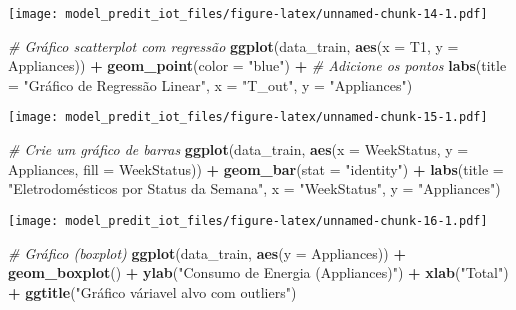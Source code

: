 \documentclass[
]{article}
\newenvironment{Shaded}{\begin{snugshade}}{\end{snugshade}}
\newcommand{\AttributeTok}[1]{\textcolor[rgb]{0.13,0.29,0.53}{#1}}
\newcommand{\CommentTok}[1]{\textcolor[rgb]{0.56,0.35,0.01}{\textit{#1}}}
\newcommand{\FunctionTok}[1]{\textcolor[rgb]{0.13,0.29,0.53}{\textbf{#1}}}
\newcommand{\NormalTok}[1]{#1}
\newcommand{\SpecialCharTok}[1]{\textcolor[rgb]{0.81,0.36,0.00}{\textbf{#1}}}
\newcommand{\StringTok}[1]{\textcolor[rgb]{0.31,0.60,0.02}{#1}}
\begin{document}
\texttt{[image: model\_predit\_iot\_files/figure-latex/unnamed-chunk-14-1.pdf]}

\begin{Shaded}
\begin{Highlighting}[]
\CommentTok{\# Gráfico scatterplot com regressão}
\FunctionTok{ggplot}\NormalTok{(data\_train, }\FunctionTok{aes}\NormalTok{(}\AttributeTok{x =}\NormalTok{ T1, }\AttributeTok{y =}\NormalTok{ Appliances)) }\SpecialCharTok{+}
  \FunctionTok{geom\_point}\NormalTok{(}\AttributeTok{color =} \StringTok{"blue"}\NormalTok{) }\SpecialCharTok{+}                    \CommentTok{\# Adicione os pontos}
  \FunctionTok{labs}\NormalTok{(}\AttributeTok{title =} \StringTok{"Gráfico de Regressão Linear"}\NormalTok{,}
       \AttributeTok{x =} \StringTok{"T\_out"}\NormalTok{,}
       \AttributeTok{y =} \StringTok{"Appliances"}\NormalTok{)}
\end{Highlighting}
\end{Shaded}

\texttt{[image: model\_predit\_iot\_files/figure-latex/unnamed-chunk-15-1.pdf]}

\begin{Shaded}
\begin{Highlighting}[]
\CommentTok{\# Crie um gráfico de barras}
\FunctionTok{ggplot}\NormalTok{(data\_train, }\FunctionTok{aes}\NormalTok{(}\AttributeTok{x =}\NormalTok{ WeekStatus, }\AttributeTok{y =}\NormalTok{ Appliances, }\AttributeTok{fill =}\NormalTok{ WeekStatus)) }\SpecialCharTok{+}
  \FunctionTok{geom\_bar}\NormalTok{(}\AttributeTok{stat =} \StringTok{"identity"}\NormalTok{) }\SpecialCharTok{+}
  \FunctionTok{labs}\NormalTok{(}\AttributeTok{title =} \StringTok{"Eletrodomésticos por Status da Semana"}\NormalTok{,}
       \AttributeTok{x =} \StringTok{"WeekStatus"}\NormalTok{,}
       \AttributeTok{y =} \StringTok{"Appliances"}\NormalTok{)}
\end{Highlighting}
\end{Shaded}

\texttt{[image: model\_predit\_iot\_files/figure-latex/unnamed-chunk-16-1.pdf]}

\begin{Shaded}
\begin{Highlighting}[]
\CommentTok{\# Gráfico (boxplot)}
\FunctionTok{ggplot}\NormalTok{(data\_train, }\FunctionTok{aes}\NormalTok{(}\AttributeTok{y =}\NormalTok{ Appliances)) }\SpecialCharTok{+}
  \FunctionTok{geom\_boxplot}\NormalTok{() }\SpecialCharTok{+}
  \FunctionTok{ylab}\NormalTok{(}\StringTok{"Consumo de Energia (Appliances)"}\NormalTok{) }\SpecialCharTok{+}
  \FunctionTok{xlab}\NormalTok{(}\StringTok{"Total"}\NormalTok{) }\SpecialCharTok{+}
  \FunctionTok{ggtitle}\NormalTok{(}\StringTok{"Gráfico váriavel alvo com outliers"}\NormalTok{)}
\end{Highlighting}
\end{Shaded}
\end{document}
